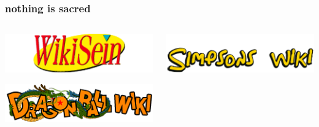 \documentclass{beamer}
\begin{document}
\begin{frame}
  \frametitle{nothing is sacred}
  \begin{columns}
    \begin{column}{0.5\textwidth}
      \includegraphics[width = \textwidth, height = 0.4\textheight, keepaspectratio = true]{figure/seinfeld}

      \vspace{2cm}

      \includegraphics[width = \textwidth, height = 0.4\textheight, keepaspectratio = true]{figure/dragonball}
    \end{column}
    \begin{column}{0.5\textwidth}
      \includegraphics[width = \textwidth, height = 0.4\textheight, keepaspectratio = true]{figure/simpsons_1}

      \vspace{1cm}


\end{column}
\end{columns}
\end{frame}
\end{document}
